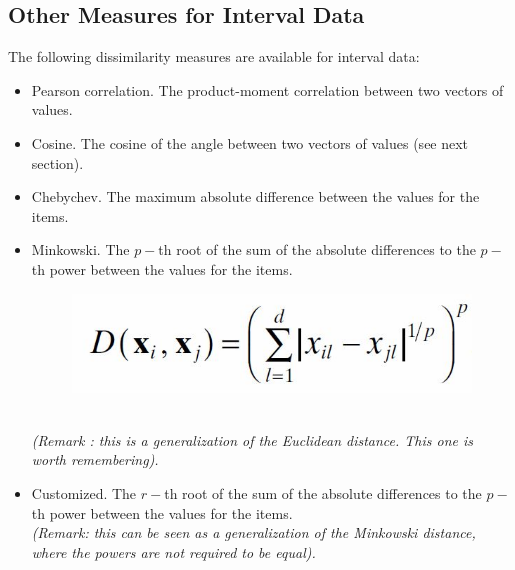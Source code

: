 \documentclass[a4paper,12pt]{article}
\begin{document}
\subsection*{Other Measures for Interval Data}
The following dissimilarity measures are available for interval data:
\begin{itemize}
%	
	\item 	Pearson correlation. The product-moment correlation between two vectors of values. 
	\item 	Cosine. The cosine of the angle between two vectors of values (see next section). 
	\item 	Chebychev. The maximum absolute difference between the values for the items. 
	\item 	Minkowski. The $p-$th root of the sum of the absolute differences to the $p-$th power between the values for the items. 
	\begin{figure}[h!]
		\centering
		\includegraphics[width=0.35\linewidth]{images/minkowski}
	\end{figure}\\
	\textit{(Remark : this is a generalization of the Euclidean distance. This one is worth remembering).}
	\item 	Customized. The $r-$th root of the sum of the absolute differences to the $p-$th power between the values for the items.\\
	\textit{(Remark: this can be seen as a generalization of the Minkowski distance, where the powers are not required to be equal).}
\end{itemize}
\end{document}
